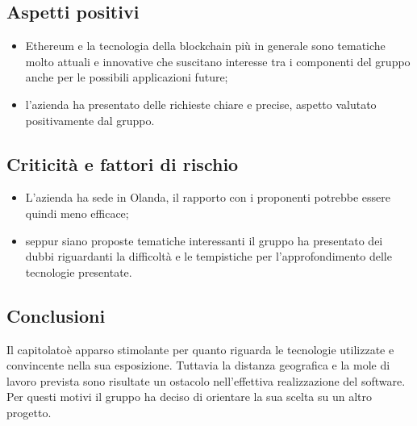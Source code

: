 \subsection{Aspetti positivi}
\begin{itemize}
    \item Ethereum e la tecnologia della blockchain più in generale sono tematiche molto attuali e innovative che suscitano interesse tra i componenti del gruppo
    anche per le possibili applicazioni future;
    \item l'azienda ha presentato delle richieste chiare e precise, aspetto valutato positivamente dal gruppo.
\end{itemize}
\subsection{Criticità e fattori di rischio}
\begin{itemize}
    \item L'azienda ha sede in Olanda, il rapporto con i proponenti potrebbe essere quindi meno efficace;
    \item seppur siano proposte tematiche interessanti il gruppo ha presentato dei dubbi riguardanti la difficoltà e le tempistiche per l'approfondimento
    delle tecnologie presentate.
\end{itemize}
\subsection{Conclusioni}
Il capitolato\glosp è apparso stimolante per quanto riguarda le tecnologie utilizzate e convincente nella sua esposizione. Tuttavia la distanza geografica e la
mole di lavoro prevista sono risultate un ostacolo nell'effettiva realizzazione del software. Per questi motivi il gruppo ha deciso di orientare la sua scelta
su un altro progetto\glo.
